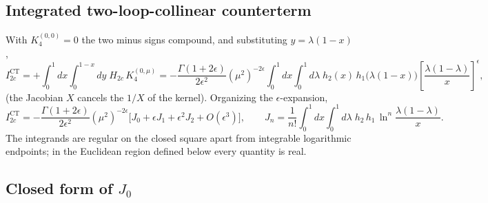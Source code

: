 \documentclass[11pt]{article}
\newcommand{\eps}{\epsilon}
\newcommand{\CT}{\mathrm{CT}}
\begin{document}
\subsection{Integrated two-loop-collinear counterterm}
\label{sec:I2c}

With $K_4^{(0,0)}=0$ the two minus signs compound, and substituting $y=\lambda(1-x)$,
\begin{equation}
I^{\CT}_{2c}
=+\int_0^1\!dx\int_0^{1-x}\!dy\;H_{2c}\,K_4^{(0,\mu)}
=-\frac{\Gamma(1+2\eps)}{2\eps^{2}}(\mu^{2})^{-2\eps}
\int_0^1\!dx\int_0^1\!d\lambda\;h_2(x)\,h_1\big(\lambda(1-x)\big)
\left[\frac{\lambda(1-\lambda)}{x}\right]^{\eps},
\end{equation}
(the Jacobian $X$ cancels the $1/X$ of the kernel). Organizing the $\eps$-expansion,
\begin{equation}
I^{\CT}_{2c}
=-\frac{\Gamma(1+2\eps)}{2\eps^{2}}(\mu^{2})^{-2\eps}
\Big[J_{0}+\eps J_{1}+\eps^{2}J_{2}+O(\eps^{3})\Big],
\qquad
J_n=\frac{1}{n!}\int_0^1\!\!dx\!\int_0^1\!\!d\lambda\;h_2\,h_1\,
\ln^{n}\!\frac{\lambda(1-\lambda)}{x} .
\label{eq:Jn}
\end{equation}
The integrands are regular on the closed square apart from integrable logarithmic endpoints; in
the Euclidean region defined below every quantity is real.

\subsection{Closed form of $J_0$}
\label{sec:J0}
\end{document}
